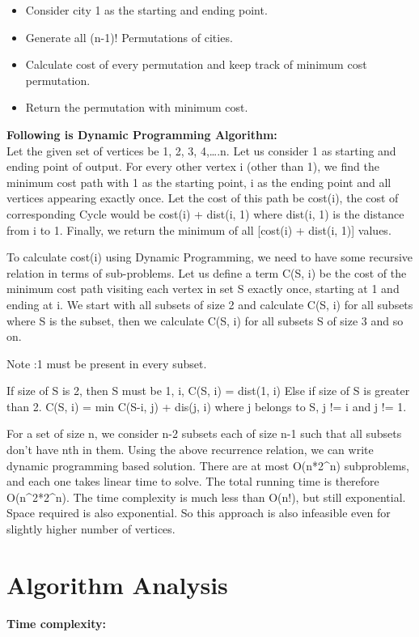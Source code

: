 \documentclass[conference]{IEEEtran}
\begin{document}
\begin{itemize}
\item Consider city 1 as the starting and ending point.
\item Generate all (n-1)! Permutations of cities.
\item Calculate cost of every permutation and keep track of minimum cost permutation.
\item Return the permutation with minimum cost.
\end{itemize}

\textbf{Following is Dynamic Programming Algorithm:}\\

Let the given set of vertices be {1, 2, 3, 4,….n}. Let us consider 1 as starting and ending point of output. For every other vertex i (other than 1), we find the minimum cost path with 1 as the starting point, i as the ending point and all vertices appearing exactly once. Let the cost of this path be cost(i), the cost of corresponding Cycle would be cost(i) + dist(i, 1) where dist(i, 1) is the distance from i to 1. Finally, we return the minimum of all [cost(i) + dist(i, 1)] values.

To calculate cost(i) using Dynamic Programming, we need to have some recursive relation in terms of sub-problems. Let us define a term C(S, i) be the cost of the minimum cost path visiting each vertex in set S exactly once, starting at 1 and ending at i.
We start with all subsets of size 2 and calculate C(S, i) for all subsets where S is the subset, then we calculate C(S, i) for all subsets S of size 3 and so on.

Note :1 must be present in every subset.

If size of S is 2, then S must be {1, i},
C(S, i) = dist(1, i)
Else if size of S is greater than 2.
C(S, i) = min { C(S-{i}, j) + dis(j, i)} where j belongs to S, j != i and j != 1.

For a set of size n, we consider n-2 subsets each of size n-1 such that all subsets don’t have nth in them.
Using the above recurrence relation, we can write dynamic programming based solution. There are at most O(n*2^n) subproblems, and each one takes linear time to solve. The total running time is therefore O(n^2*2^n). The time complexity is much less than O(n!), but still exponential. Space required is also exponential. So this approach is also infeasible even for slightly higher number of vertices.

\section{Algorithm Analysis}
\textbf{Time complexity:}\\
\end{document}
